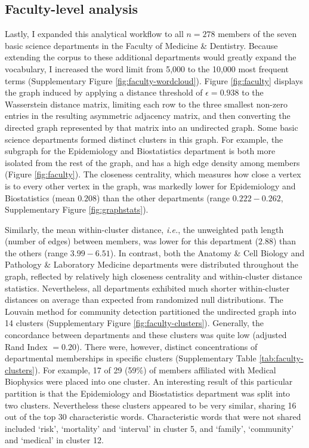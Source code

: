 \documentclass[12pt]{article}
\begin{document}
\subsection * {Faculty-level analysis}
Lastly, I expanded this analytical workflow to all $n=278$ members of the seven basic science departments in the Faculty of Medicine \& Dentistry.
Because extending the corpus to these additional departments would greatly expand the vocabulary, I increased the word limit from 5,000 to the 10,000 most frequent terms (Supplementary Figure \ref{fig:faculty-wordcloud}).
Figure \ref{fig:faculty} displays the graph induced by applying a distance threshold of $\epsilon=0.938$ to the Wasserstein distance matrix, limiting each row to the three smallest non-zero entries in the resulting asymmetric adjacency matrix, and then converting the directed graph represented by that matrix into an undirected graph.
Some basic science departments formed distinct clusters in this graph.
For example, the subgraph for the Epidemiology and Biostatistics department is both more isolated from the rest of the graph, and has a high edge density among members (Figure \ref{fig:faculty}).
The closeness centrality, which measures how close a vertex is to every other vertex in the graph, was markedly lower for Epidemiology and Biostatistics (mean $0.208$) than the other departments (range $0.222-0.262$, Supplementary Figure \ref{fig:graphstats}).


Similarly, the mean within-cluster distance, \textit{i.e.}, the unweighted path length (number of edges) between members, was lower for this department ($2.88$) than the others (range $3.99-6.51$).
In contrast, both the Anatomy \& Cell Biology and Pathology \& Laboratory Medicine departments were distributed throughout the graph, reflected by relatively high closeness centrality and within-cluster distance statistics.
Nevertheless, all departments exhibited much shorter within-cluster distances on average than expected from randomized null distributions.
The Louvain method for community detection partitioned the undirected graph into 14 clusters (Supplementary Figure \ref{fig:faculty-clusters}).
Generally, the concordance between departments and these clusters was quite low (adjusted Rand Index $=0.20$).
There were, however, distinct concentrations of departmental memberships in specific clusters (Supplementary Table \ref{tab:faculty-clusters}).
For example, 17 of 29 (59\%) of members affiliated with  Medical Biophysics were placed into one cluster.
An interesting result of this particular partition is that the Epidemiology and Biostatistics department was split into two clusters.
Nevertheless these clusters appeared to be very similar, sharing 16 out of the top 30 characteristic words.
Characteristic words that were not shared included `risk', `mortality' and `interval' in cluster 5, and `family', `community' and `medical' in cluster 12.
\end{document}
